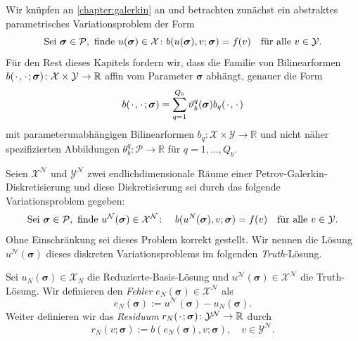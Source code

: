 \documentclass[../main.tex]{subfiles}
\begin{document}
Wir knüpfen an \cref{chapter:galerkin} an und betrachten zunächst ein abstraktes parametrisches Variationsproblem der Form
\begin{equation}
    \text{Sei } \bm \sigma \in \mathcal P, \text{ finde } u(\bm \sigma) \in \mathcal X \colon b(u(\bm \sigma), v; \bm \sigma) = f(v) \quad \fa v \in \mathcal Y.
\end{equation}
Für den Rest dieses Kapitels fordern wir, dass die Familie von Bilinearformen $b(\blank, \blank; \bm \sigma) \colon \mathcal X \times \mathcal Y \to \mathbb{R}$ affin vom Parameter $\bm \sigma$ abhängt, genauer die Form
\begin{equation}
     b(\blank, \blank; \bm \sigma) = \sum_{q = 1}^{Q_b} \theta_{b}^{q}(\bm \sigma) b_{q}(\blank, \blank)
 \end{equation}
 mit parameterunabhängigen Bilinearformen $b_{q} \colon \mathcal X \times \mathcal Y \to \mathbb{R}$ und nicht näher spezifizierten Abbildungen $\theta_{b}^{q} \colon \mathcal P \to \mathbb{R}$ für $q = 1, \dots, Q_{b}$.

\begin{Definition}
    Seien $\mathcal X^{\mathcal N}$ und $\mathcal Y^{\mathcal N}$ zwei endlichdimensionale Räume einer Petrov-Galerkin-Diskretisierung und diese Diskretisierung sei durch das folgende Variationsproblem gegeben:
    \begin{equation}
        \text{Sei } \bm \sigma \in \mathcal P, \text{ finde } u^{\mathcal N}(\bm \sigma) \in \mathcal X^{\mathcal N} \colon \quad b(u^{N}(\bm \sigma), v; \bm \sigma) = f(v) \quad \fa v \in \mathcal Y.
    \end{equation}
    Ohne Einschränkung sei dieses Problem korrekt gestellt.
    Wir nennen die Lösung $u^{\mathcal N}(\bm \sigma)$ dieses diskreten Variationsproblems im folgenden \emph{Truth}-Lösung.
\end{Definition}

\begin{Definition}
    Sei $u_{N}(\bm \sigma) \in \mathcal X_{N}$ die Reduzierte-Basis-Lösung und $u^{\mathcal N}(\bm \sigma) \in \mathcal X^{\mathcal N}$ die Truth-Lösung.
    Wir definieren den \emph{Fehler} $e_{N}(\bm \sigma) \in \mathcal X^{\mathcal N}$ als
    \begin{equation}
        e_{N}(\bm \sigma) := u^{\mathcal N}(\bm \sigma) - u_{N}(\bm \sigma).
    \end{equation}
    Weiter definieren wir das \emph{Residuum} $r_{N}(\blank; \bm \sigma) \colon \mathcal Y^{\mathcal N} \to \mathbb{R}$ durch
    \begin{equation}
    \label{eq:variationsproblem_residuum}
        r_{N}(v; \bm \sigma) := b(e_{N}(\bm \sigma), v; \bm \sigma), \quad v \in \mathcal Y^{\mathcal N}.
    \end{equation}
\end{Definition}
\end{document}
